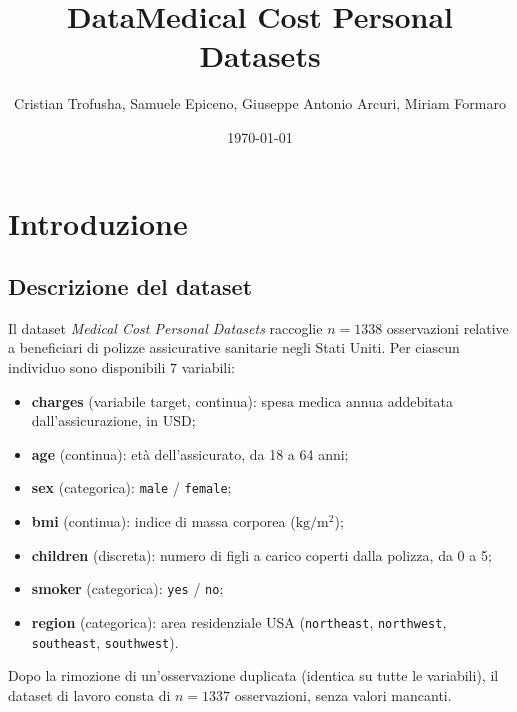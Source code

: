 \documentclass[11pt,a4paper]{article}
\title{DataMedical Cost Personal Datasets}
\author{Cristian Trofusha, Samuele Epiceno, Giuseppe Antonio Arcuri, Miriam Formaro}
\date{\today}
\begin{document}
\maketitle
\tableofcontents
\newpage

\section{Introduzione}

\subsection{Descrizione del dataset}
Il dataset \emph{Medical Cost Personal Datasets} raccoglie $n=1338$ osservazioni
relative a beneficiari di polizze assicurative sanitarie negli Stati Uniti.
Per ciascun individuo sono disponibili $7$ variabili:

\begin{itemize}[nosep]
    \item \textbf{charges} (variabile target, continua): spesa medica annua
    addebitata dall'assicurazione, in USD;
    \item \textbf{age} (continua): età dell'assicurato, da 18 a 64 anni;
    \item \textbf{sex} (categorica): \texttt{male} / \texttt{female};
    \item \textbf{bmi} (continua): indice di massa corporea ($\mathrm{kg/m^2}$);
    \item \textbf{children} (discreta): numero di figli a carico coperti dalla polizza, da 0 a 5;
    \item \textbf{smoker} (categorica): \texttt{yes} / \texttt{no};
    \item \textbf{region} (categorica): area residenziale USA (\texttt{northeast},
    \texttt{northwest}, \texttt{southeast}, \texttt{southwest}).
\end{itemize}

Dopo la rimozione di un'osservazione duplicata (identica su tutte le variabili),
il dataset di lavoro consta di $n=1337$ osservazioni, senza valori mancanti.
\end{document}
